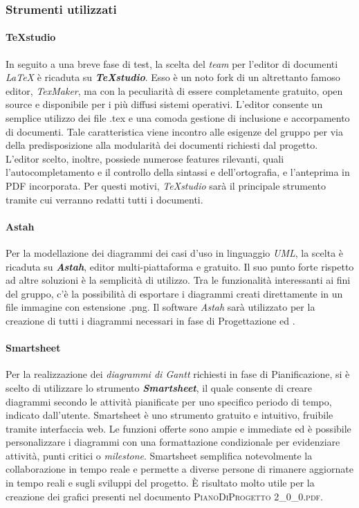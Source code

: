 	\subsubsection{Strumenti utilizzati}
	
		\paragraph{TeXstudio}
		In seguito a una breve fase di test, la scelta del \textit{team} per l'editor di documenti \textit{\LaTeX{}} è ricaduta su \textit{\textbf{TeXstudio}}. Esso è un noto fork di un altrettanto famoso editor, \textit{TexMaker}, ma con la peculiarità di essere completamente gratuito, open source e disponibile per i più diffusi sistemi operativi. L'editor consente un semplice utilizzo dei file .tex e una comoda gestione di inclusione e accorpamento di documenti. Tale caratteristica viene incontro alle esigenze del gruppo per via della predisposizione alla modularità dei documenti richiesti dal progetto. L'editor scelto, inoltre, possiede numerose features rilevanti, quali l'autocompletamento e il controllo della sintassi e dell'ortografia, e l'anteprima in PDF incorporata. Per questi motivi, \textit{TeXstudio} sarà il principale strumento tramite cui verranno redatti tutti i documenti.
	
		\paragraph{Astah}
		Per la modellazione dei diagrammi dei casi d'uso in linguaggio \textit{UML}, la scelta è ricaduta su \textit{\textbf{Astah}}, editor multi-piattaforma e gratuito. Il suo punto forte rispetto ad altre soluzioni è la semplicità di utilizzo. Tra le funzionalità interessanti ai fini del gruppo, c'è la possibilità di esportare i diagrammi creati direttamente in un file immagine con estensione .png. Il software \textit{Astah} sarà utilizzato per la creazione di tutti i diagrammi necessari in fase di Progettazione ed \AdR.
		
		\paragraph{Smartsheet}
		Per la realizzazione dei \textit{diagrammi di Gantt} richiesti in fase di Pianificazione, si è scelto di utilizzare lo strumento \textit{\textbf{Smartsheet}}, il quale consente di creare diagrammi secondo le attività pianificate per uno specifico periodo di tempo, indicato dall'utente.
		Smartsheet è uno strumento gratuito e intuitivo, fruibile tramite interfaccia web. Le funzioni offerte sono ampie e immediate ed è possibile personalizzare i diagrammi con una formattazione condizionale per evidenziare attività, punti critici o \textit{milestone}. Smartsheet semplifica notevolmente la collaborazione in tempo reale e permette a diverse persone di rimanere aggiornate in tempo reali e sugli sviluppi del progetto. \MakeUppercase{è} risultato molto utile per la creazione dei grafici presenti nel documento \textsc{PianoDiProgetto 2\_0\_0.pdf}.
		
